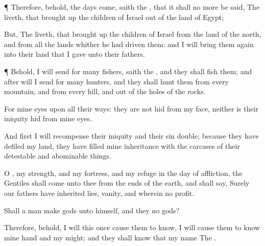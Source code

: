 {\par }{\PP {}¶ Therefore, behold, the
days
come,
saith the
{}, that it shall no more be
said, The
{}
liveth, that brought
up the
children of
Israel out of the
land of
Egypt;

But, The
{}
liveth, that brought
up the
children of
Israel from the
land of the
north, and from all the
lands whither he had
driven them: and I will bring them
again into their
land that I
gave unto their
fathers.


\par }{\PP {}¶ Behold, I will
send for
many
fishers,
saith the
{}, and they shall
fish them; and
after will I
send for
many
hunters, and they shall
hunt them from every
mountain, and from every
hill, and out of the
holes of the
rocks.

For mine
eyes
{} upon all their
ways: they are not
hid from my
face, neither is their
iniquity
hid
from mine
eyes.

And
first I will
recompense their
iniquity and their
sin
double; because they have
defiled my
land, they have
filled mine
inheritance with the
carcases of their
detestable and abominable
things.

O
{}, my
strength, and my
fortress, and my
refuge in the
day of
affliction, the
Gentiles shall
come unto thee from the
ends of the
earth, and shall
say, Surely our
fathers have
inherited
lies,
vanity, and
{} wherein
{} no
profit.

Shall a
man
make
gods unto himself, and they
{} no
gods?

Therefore, behold, I will this
once cause them to
know, I will cause them to
know mine
hand and my
might; and they shall
know that my
name
{} The
{}.




\par }
